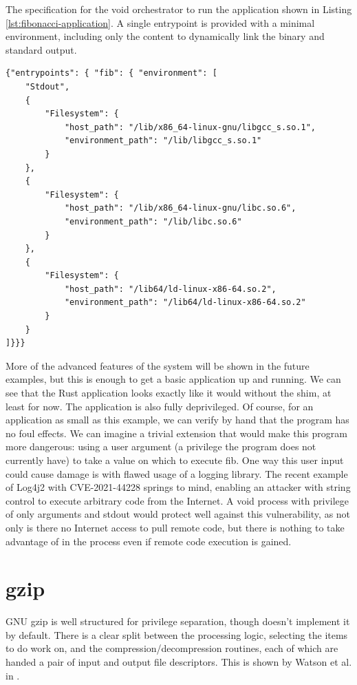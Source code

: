 \documentclass[12pt,a4paper,twoside]{report}
\begin{document}
\begin{listing}
\label{lst:fibonacci-application-spec}
\caption{The specification for the void orchestrator to run the application shown in Listing \ref{lst:fibonacci-application}. A single entrypoint is provided with a minimal environment, including only the content to dynamically link the binary and standard output.}

\begin{verbatim}
{"entrypoints": { "fib": { "environment": [
    "Stdout",
    {
        "Filesystem": {
            "host_path": "/lib/x86_64-linux-gnu/libgcc_s.so.1",
            "environment_path": "/lib/libgcc_s.so.1"
        }
    },
    {
        "Filesystem": {
            "host_path": "/lib/x86_64-linux-gnu/libc.so.6",
            "environment_path": "/lib/libc.so.6"
        }
    },
    {
        "Filesystem": {
            "host_path": "/lib64/ld-linux-x86-64.so.2",
            "environment_path": "/lib64/ld-linux-x86-64.so.2"
        }
    }
]}}}
\end{verbatim}
\end{listing}

More of the advanced features of the system will be shown in the future examples, but this is enough to get a basic application up and running. We can see that the Rust application looks exactly like it would without the shim, at least for now. The application is also fully deprivileged. Of course, for an application as small as this example, we can verify by hand that the program has no foul effects. We can imagine a trivial extension that would make this program more dangerous: using a user argument (a privilege the program does not currently have) to take a value on which to execute fib. One way this user input could cause damage is with flawed usage of a logging library. The recent example of Log4j2 with CVE-2021-44228 springs to mind, enabling an attacker with string control to execute arbitrary code from the Internet. A void process with privilege of only arguments and stdout would protect well against this vulnerability, as not only is there no Internet access to pull remote code, but there is nothing to take advantage of in the process even if remote code execution is gained.

\section{gzip}
\label{sec:building-gzip}

GNU gzip \citep{gailly_gzip_2020} is well structured for privilege separation, though doesn't implement it by default. There is a clear split between the processing logic, selecting the items to do work on, and the compression/decompression routines, each of which are handed a pair of input and output file descriptors. This is shown by Watson et al. in \cite{watson_capsicum_2010}.
\end{document}
